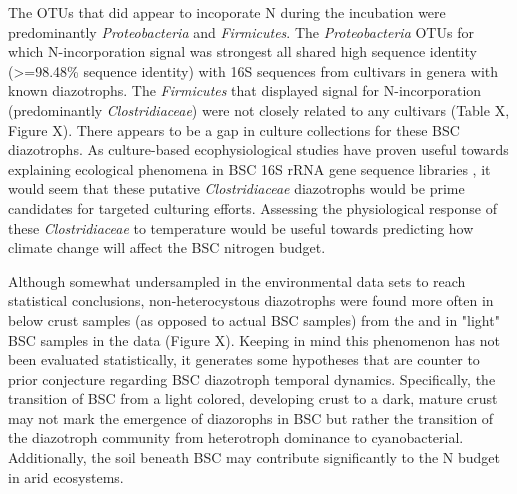 The OTUs that did appear to incoporate N during the incubation were predominantly \textit{Proteobacteria} and \textit{Firmicutes}. The \textit{Proteobacteria} OTUs for which N-incorporation signal was strongest all shared high sequence identity (\textgreater=98.48\% sequence identity) with 16S sequences from cultivars in genera with known diazotrophs. The \textit{Firmicutes} that displayed signal for N-incorporation (predominantly \textit{Clostridiaceae}) were not closely related to any cultivars (Table X, Figure X). There appears to be a gap in culture collections for these BSC diazotrophs. As culture-based ecophysiological studies have proven useful towards explaining ecological phenomena in BSC 16S rRNA gene sequence libraries \cite{Garcia_Pichel_2013}, it would seem that these putative \textit{Clostridiaceae} diazotrophs would be prime candidates for targeted culturing efforts. Assessing the physiological response of these \textit{Clostridiaceae} to temperature would be useful towards predicting how climate change will affect the BSC nitrogen budget. 

Although somewhat undersampled in the environmental data sets to reach statistical conclusions, non-heterocystous diazotrophs were found more often in below crust samples (as opposed to actual BSC samples) from the \citet{Steven_2013} and in "light" BSC samples in the \citet{Garcia_Pichel_2013} data (Figure X). Keeping in mind this phenomenon has not been evaluated statistically, it generates some hypotheses that are counter to prior conjecture regarding BSC diazotroph temporal dynamics. Specifically, the transition of BSC from a light colored, developing crust to a dark, mature crust may not mark the emergence of diazorophs in BSC but rather the transition of the diazotroph community from heterotroph dominance to cyanobacterial. Additionally, the soil beneath BSC may contribute significantly to the N budget in arid ecosystems.

